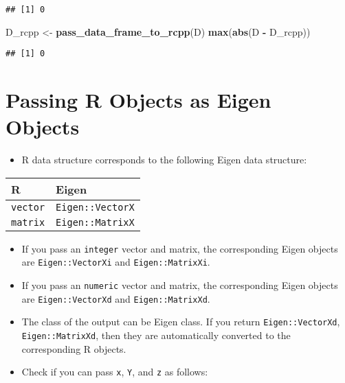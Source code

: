 \documentclass[
]{book}
\newenvironment{Shaded}{\begin{snugshade}}{\end{snugshade}}
\newcommand{\KeywordTok}[1]{\textcolor[rgb]{0.13,0.29,0.53}{\textbf{#1}}}
\newcommand{\NormalTok}[1]{#1}
\newcommand{\OperatorTok}[1]{\textcolor[rgb]{0.81,0.36,0.00}{\textbf{#1}}}
\newcommand{\StringTok}[1]{\textcolor[rgb]{0.31,0.60,0.02}{#1}}
\providecommand{\tightlist}{%
  \setlength{\itemsep}{0pt}\setlength{\parskip}{0pt}}
\begin{document}
\begin{verbatim}
## [1] 0
\end{verbatim}

\begin{Shaded}
\begin{Highlighting}[]
\NormalTok{D_rcpp <-}\StringTok{ }\KeywordTok{pass_data_frame_to_rcpp}\NormalTok{(D)}
\KeywordTok{max}\NormalTok{(}\KeywordTok{abs}\NormalTok{(D }\OperatorTok{-}\StringTok{ }\NormalTok{D_rcpp))}
\end{Highlighting}
\end{Shaded}

\begin{verbatim}
## [1] 0
\end{verbatim}

\hypertarget{passing-r-objects-as-eigen-objects}{%
\section{Passing R Objects as Eigen Objects}\label{passing-r-objects-as-eigen-objects}}

\begin{itemize}
\tightlist
\item
  R data structure corresponds to the following Eigen data structure:
\end{itemize}

\begin{longtable}[]{@{}ll@{}}
\toprule
R & Eigen\tabularnewline
\midrule
\endhead
\texttt{vector} & \texttt{Eigen::VectorX}\tabularnewline
\texttt{matrix} & \texttt{Eigen::MatrixX}\tabularnewline
\bottomrule
\end{longtable}

\begin{itemize}
\tightlist
\item
  If you pass an \texttt{integer} vector and matrix, the corresponding Eigen objects are \texttt{Eigen::VectorXi} and \texttt{Eigen::MatrixXi}.
\item
  If you pass an \texttt{numeric} vector and matrix, the corresponding Eigen objects are \texttt{Eigen::VectorXd} and \texttt{Eigen::MatrixXd}.
\item
  The class of the output can be Eigen class. If you return \texttt{Eigen::VectorXd}, \texttt{Eigen::MatrixXd}, then they are automatically converted to the corresponding R objects.
\item
  Check if you can pass \texttt{x}, \texttt{Y}, and \texttt{z} as follows:
\end{itemize}
\end{document}

